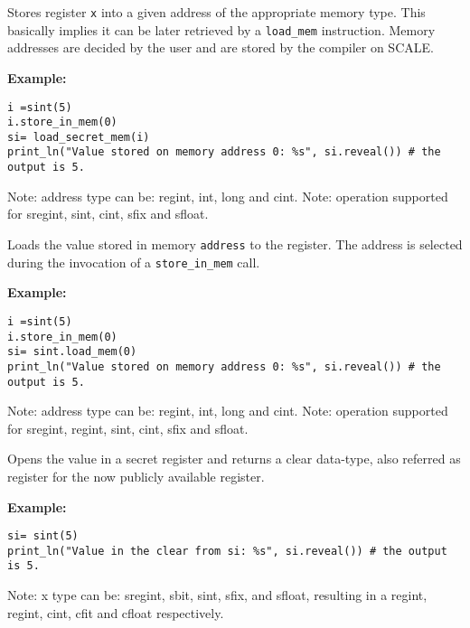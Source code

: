 Stores register \verb|x| into a given address
of the appropriate memory type. This basically implies it can be later retrieved by a \verb|load_mem| instruction. Memory addresses are decided by the user and are  stored by the compiler on SCALE.

\noindent
\textbf{Example:}
\begin{lstlisting}
i =sint(5)
i.store_in_mem(0)
si= load_secret_mem(i)
print_ln("Value stored on memory address 0: %s", si.reveal()) # the output is 5.
\end{lstlisting}
\begin{footnotesize}
Note: address type can be: regint, int, long and cint.
Note: operation supported for sregint, sint, cint, sfix and sfloat.
\end{footnotesize}

Loads the value stored in memory \verb|address| to the register. 
The address is selected during the invocation of a \verb|store_in_mem| call. 

\noindent
\textbf{Example:}
\begin{lstlisting}
i =sint(5)
i.store_in_mem(0)
si= sint.load_mem(0)
print_ln("Value stored on memory address 0: %s", si.reveal()) # the output is 5.
\end{lstlisting}
\begin{footnotesize}
Note: address type can be: regint, int, long and cint.
Note: operation supported for sregint, regint, sint, cint, sfix and sfloat.
\end{footnotesize}

Opens the value in a secret register and returns a clear data-type, 
also referred as register for the now publicly available register.

\noindent
\textbf{Example:}
\begin{lstlisting}
si= sint(5)
print_ln("Value in the clear from si: %s", si.reveal()) # the output is 5.
\end{lstlisting}
\begin{footnotesize}
Note: x type can be: sregint, sbit, sint, sfix, and sfloat, resulting in a
regint, regint, cint, cfit and cfloat respectively.
\end{footnotesize}

